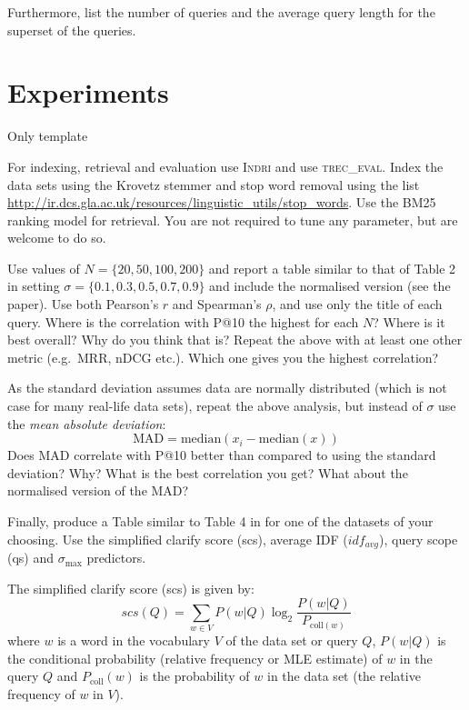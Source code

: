 \documentclass{sig-alternate}
\begin{document}
Furthermore, list the number of queries and the average query length for the superset of the queries.

\section{Experiments}
Only template

For indexing, retrieval and evaluation use \textsc{Indri} and use \textsc{trec\_eval}. Index the data sets using the Krovetz stemmer and stop word removal using the list \url{http://ir.dcs.gla.ac.uk/resources/linguistic_utils/stop_words}. Use the BM25 ranking model for retrieval. You are not required to tune any parameter, but are welcome to do so.

Use values of $N=\{20,50,100,200\}$ and report a table similar to that of Table 2 in \cite{cummins2011improved} setting $\sigma=\{0.1,0.3,0.5,0.7,0.9\}$ and include the normalised version (see the paper). Use both Pearson's $r$ and Spearman's $\rho$, and use only the title of each query. Where is the correlation with P@10 the highest for each $N$? Where is it best overall? Why do you think that is? Repeat the above with at least one other metric (e.g.\ MRR, nDCG etc.). Which one gives you the highest correlation?

As the standard deviation assumes data are normally distributed (which is not case for many real-life data sets), repeat the above analysis, but instead of $\sigma$ use the \emph{mean absolute deviation}:
\begin{equation}
\text{MAD} = \text{median}\left(x_i - \text{median}(x)\right)
\end{equation}
Does MAD correlate with P@10 better than compared to using the standard deviation? Why? What is the best correlation you get? What about the normalised version of the MAD?

Finally, produce a Table similar to Table 4 in \cite{cummins2011improved} for one of the datasets of your choosing. Use the simplified clarify score (scs), average IDF ($idf_{avg}$), query scope (qs) and $\sigma_{\max}$ predictors. 

The simplified clarify score \cite{he2004inferring} (scs) is given by:
\begin{equation}
scs(Q) = \displaystyle\sum_{w\in V}P(w\vert Q)\log_2\frac{P(w\vert Q)}{P_{\text{coll}(w)}}
\end{equation}
where $w$ is a word in the vocabulary $V$ of the data set or query $Q$, $P(w\vert Q)$ is the conditional probability (relative frequency or MLE estimate) of $w$ in the query $Q$ and $P_{\text{coll}}(w)$ is the probability of $w$ in the data set (the relative frequency of $w$ in $V$).
\end{document}
